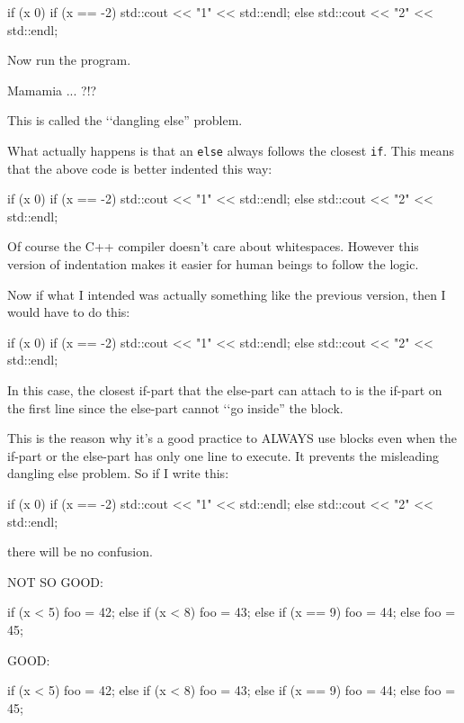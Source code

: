 \begin{console}
if (x  0)
   if (x == -2) std::cout << "1" << std::endl;
else
   std::cout << "2" << std::endl; 
\end{console}
Now run the program.

Mamamia ... ?!?

This is called the \lq\lq dangling else'' problem.

What actually happens is that an \texttt{else} always follows the closest
\texttt{if}. This means that the above code is better indented this way:
\begin{console}
if (x  0)
   if (x == -2) std::cout << "1" << std::endl;
   else
       std::cout << "2" << std::endl; 
\end{console}

Of course the C++ compiler doesn't care about
whitespaces. However this version of indentation makes it easier for
human beings to follow the logic.

Now if what I intended was actually something like the previous version,
then I would have to do this:
\begin{console}
if (x  0)
{
   if (x == -2) std::cout << "1" << std::endl;
}
else
    std::cout << "2" << std::endl; 
\end{console}
In this case, the closest if-part that the else-part can attach to is
the if-part on the first line since the else-part cannot \lq\lq go inside''
the block.

This is the reason why it's a good practice to ALWAYS
use blocks even when the if-part or the else-part has only one line to
execute. It prevents the misleading dangling else problem. So if I write
this:
\begin{console}
if (x  0)
{
   if (x == -2)
   {
       std::cout << "1" << std::endl;
   }
}
else
{
     std::cout << "2" << std::endl;
}
\end{console}

there will be no confusion.

\newpage{}

NOT SO GOOD:\\
\begin{console}
if (x < 5)
{
    foo = 42;
}
else
{
     if (x < 8)
     {
         foo = 43;
     }
     else
     {
         if (x == 9)
         {
             foo = 44;
         }
         else
         {
             foo = 45;
         }
     }
}
\end{console}
GOOD:\\
\begin{console}
if (x < 5)
{
    foo = 42;
}
else if (x < 8)
{
    foo = 43;
}
else if (x == 9)
{
    foo = 44;
}
else
{
    foo = 45;
}
\end{console}

